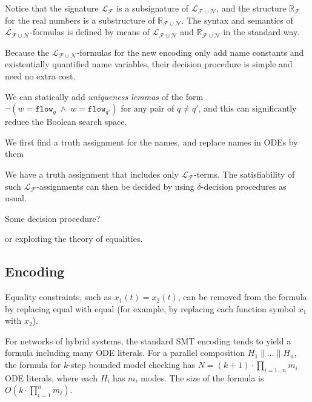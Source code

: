 Notice that the signature $\mathcal{L}_\mathcal{F}$ is a subsignature of $\mathcal{L}_{\mathcal{F}\cup\mathcal{N}}$,
and the structure $\mathbb{R}_\mathcal{F}$ for the real numbers 
is a substructure of $\mathbb{R}_{\mathcal{F}\cup\mathcal{N}}$.
The syntax and semantics of $\mathcal{L}_{\mathcal{F}\cup\mathcal{N}}$-formulas 
is defined by means of $\mathcal{L}_{\mathcal{F}\cup\mathcal{N}}$ and $\mathbb{R}_{\mathcal{F}\cup\mathcal{N}}$
in the standard way.


Because the $\mathcal{L}_{\mathcal{F}\cup\mathcal{N}}$-formulas for the new encoding
only add name constants and existentially quantified name variables,
their decision procedure %
 is simple and need no extra cost.

We can statically add \emph{uniqueness lemmas} of the form
$\neg (w = \texttt{flow}_q \;\wedge\; w = \texttt{flow}_{q'})$ for any pair of $q \neq q'$,
and this can significantly reduce the Boolean search space.

We first find a truth assignment for the names, and 
replace names in ODEs by them

We have a truth assignment that includes only $\mathcal{L}_\mathcal{F}$-terms.
The satisfiability of such $\mathcal{L}_\mathcal{F}$-assignments
can then be decided by using $\delta$-decision procedures as usual.

\begin{theorem}
Some decision procedure?
\end{theorem}

or exploiting the theory of equalities.



\subsection{Encoding}

Equality  constraints, such as $x_1(t) = x_2(t)$, 
 can be removed
from the formula by replacing equal with equal
(for example, by replacing each function symbol $x_1$ with  $x_2$).



For networks of hybrid systems,
the standard SMT encoding tends to yield a formula 
including many ODE literals. 
For %
a parallel composition
 $H_1 \parallel \ldots \parallel H_n$, %
the formula for $k$-step bounded model checking  
has $N = (k+1) \cdot \prod_{i = 1\ldots n} m_i$ ODE literals,
where each $H_i$ has $m_i$ modes.
The size of the formula is 
$O(k \cdot \prod_{i = 1}^n m_i)$.



